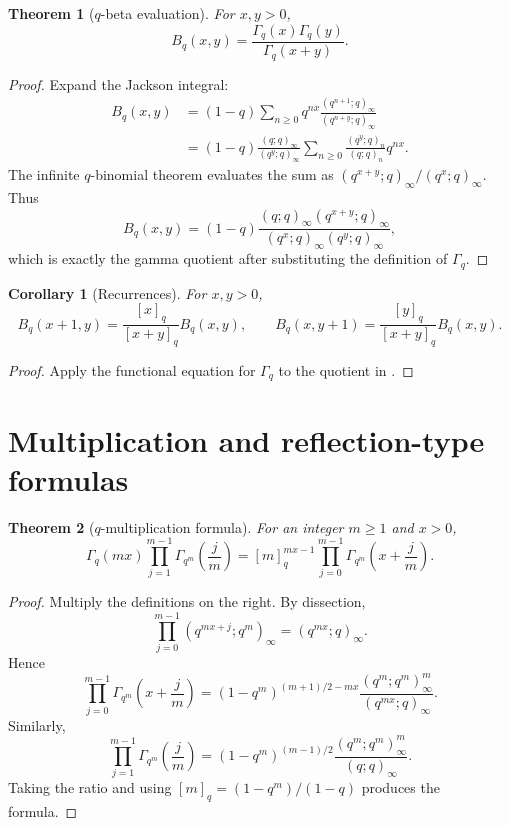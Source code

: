 \documentclass[11pt,a4paper,oneside,openany]{book}
\newtheorem{theorem}{Theorem}[chapter]
\newtheorem{corollary}[corollary]{Corollary}
\theoremstyle{definition}
\theoremstyle{remark}
\begin{document}
\begin{theorem}[$q$-beta evaluation]\label{thm:qbeta}
For $x,y>0$,
\[
 B_q(x,y)=\frac{\Gamma_q(x)\Gamma_q(y)}{\Gamma_q(x+y)}.
\]
\end{theorem}

\begin{proof}
Expand the Jackson integral:
\begin{align*}
 B_q(x,y)
 &=(1-q)\sum_{n\ge0}q^{nx}
 \frac{(q^{n+1};q)_\infty}{(q^{n+y};q)_\infty}\\
 &=(1-q)\frac{(q;q)_\infty}{(q^y;q)_\infty}
 \sum_{n\ge0}\frac{(q^y;q)_n}{(q;q)_n}q^{nx}.
\end{align*}
The infinite $q$-binomial theorem evaluates the sum as
\(
 (q^{x+y};q)_\infty/(q^x;q)_\infty.
\)
Thus
\[
 B_q(x,y)
 =(1-q)\frac{(q;q)_\infty(q^{x+y};q)_\infty}
 {(q^x;q)_\infty(q^y;q)_\infty},
\]
which is exactly the gamma quotient after substituting the definition of $\Gamma_q$.
\end{proof}

\begin{corollary}[Recurrences]\label{cor:qbeta-recurrence}
For $x,y>0$,
\[
 B_q(x+1,y)=\frac{[x]_q}{[x+y]_q}B_q(x,y),
 \qquad
 B_q(x,y+1)=\frac{[y]_q}{[x+y]_q}B_q(x,y).
\]
\end{corollary}

\begin{proof}
Apply the functional equation for $\Gamma_q$ to the quotient in .
\end{proof}

\section{Multiplication and reflection-type formulas}

\begin{theorem}[$q$-multiplication formula]\label{thm:qgamma-multiplication}
For an integer $m\ge1$ and $x>0$,
\[
 \Gamma_q(mx)\prod_{j=1}^{m-1}\Gamma_{q^m}\!\left(\frac jm\right)
 =[m]_q^{mx-1}
 \prod_{j=0}^{m-1}\Gamma_{q^m}\!\left(x+\frac jm\right).
\]
\end{theorem}

\begin{proof}
Multiply the definitions on the right.  By dissection,
\[
 \prod_{j=0}^{m-1}(q^{mx+j};q^m)_\infty=(q^{mx};q)_\infty.
\]
Hence
\[
 \prod_{j=0}^{m-1}\Gamma_{q^m}\!\left(x+\frac jm\right)
 =(1-q^m)^{(m+1)/2-mx}
 \frac{(q^m;q^m)_\infty^m}{(q^{mx};q)_\infty}.
\]
Similarly,
\[
 \prod_{j=1}^{m-1}\Gamma_{q^m}\!\left(\frac jm\right)
 =(1-q^m)^{(m-1)/2}
 \frac{(q^m;q^m)_\infty^m}{(q;q)_\infty}.
\]
Taking the ratio and using
\(
 [m]_q=(1-q^m)/(1-q)
\)
produces the formula.
\end{proof}
\end{document}
